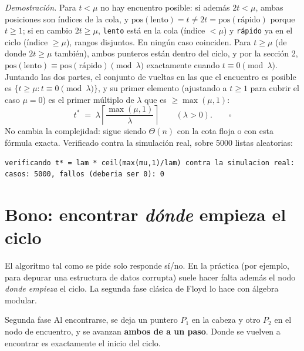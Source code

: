 \documentclass[11pt]{article}
\begin{document}
\textit{Demostración.} Para $t<\mu$ no hay encuentro posible: si además $2t<\mu$, ambas posiciones son
índices de la cola, y $\mathrm{pos}(\mathrm{lento})=t\ne 2t=\mathrm{pos}(\text{rápido})$ porque $t\ge1$; si en
cambio $2t\ge\mu$, \texttt{lento} está en la cola (índice $<\mu$) y \texttt{rápido} ya en el ciclo (índice
$\ge\mu$), rangos disjuntos. En ningún caso coinciden. Para $t\ge\mu$ (de donde $2t\ge\mu$ también), ambos
punteros están dentro del ciclo, y por la sección 2, $\mathrm{pos}(\mathrm{lento})\equiv
\mathrm{pos}(\text{rápido})\pmod\lambda$ exactamente cuando $t\equiv0\pmod\lambda$. Juntando las dos partes,
el conjunto de vueltas en las que el encuentro es posible es $\{t\ge\mu:t\equiv0\pmod\lambda\}$, y su primer
elemento (ajustando a $t\ge1$ para cubrir el caso $\mu=0$) es el primer múltiplo de $\lambda$ que es
$\ge\max(\mu,1)$:
\[ t^\ast \;=\; \lambda\left\lceil\frac{\max(\mu,1)}{\lambda}\right\rceil \qquad(\lambda>0). \qquad\square \]
No cambia la complejidad: sigue siendo $\Theta(n)$ con la cota floja o con esta fórmula exacta. Verificado
contra la simulación real, sobre 5000 listas aleatorias:
\begin{lstlisting}[style=salida]
verificando t* = lam * ceil(max(mu,1)/lam) contra la simulacion real:
casos: 5000, fallos (deberia ser 0): 0
\end{lstlisting}

\section*{Bono: encontrar \emph{dónde} empieza el ciclo}

El algoritmo tal como se pide solo responde sí/no. En la práctica (por ejemplo, para depurar una estructura de
datos corrupta) suele hacer falta además el nodo \emph{donde empieza} el ciclo. La segunda fase clásica de Floyd lo hace con álgebra modular.

\begin{resultado}{Segunda fase}
Al encontrarse, se deja un puntero $P_1$ en la cabeza y otro $P_2$ en el nodo de encuentro, y se avanzan
\textbf{ambos de a un paso}. Donde se vuelven a encontrar es exactamente el inicio del ciclo.
\end{resultado}
\end{document}
